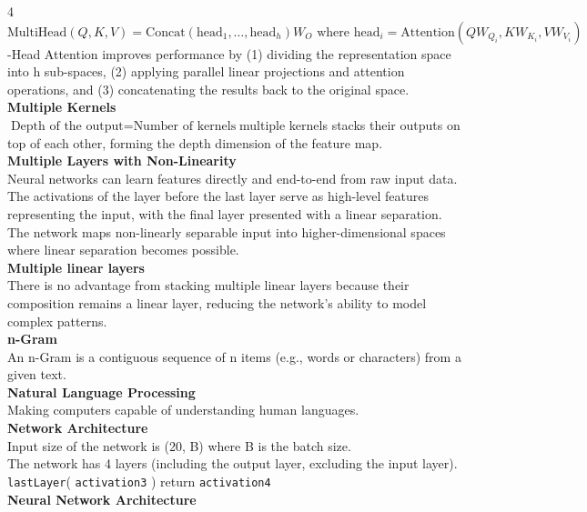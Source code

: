 \documentclass[8pt]{extarticle}
\begin{document}
\begin{multicols}{4}
$ \text{MultiHead}(Q, K, V) = \text{Concat}(\text{head}_1, \dots, \text{head}_h) W_O \text{ where } \text{head}_i = \text{Attention}(Q W_{Q_i}, K W_{K_i}, V W_{V_i})$\Multi-Head Attention improves performance by (1) dividing the representation space into h sub-spaces, (2) applying parallel linear projections and attention operations, and (3) concatenating the results back to the original space.\\
\vspace{2pt}\textbf{Multiple Kernels}\\
$ \text{Depth of the output} = \text{Number of kernels}$\Applying multiple kernels stacks their outputs on top of each other, forming the depth dimension of the feature map.\\
\vspace{2pt}\textbf{Multiple Layers with Non-Linearity}\\
Neural networks can learn features directly and end-to-end from raw input data. The activations of the layer before the last layer serve as high-level features representing the input, with the final layer presented with a linear separation. The network maps non-linearly separable input into higher-dimensional spaces where linear separation becomes possible.\\
\vspace{2pt}\textbf{Multiple linear layers}\\
There is no advantage from stacking multiple linear layers because their composition remains a linear layer, reducing the network's ability to model complex patterns.\\
\vspace{2pt}\textbf{n-Gram}\\
An n-Gram is a contiguous sequence of n items (e.g., words or characters) from a given text.\\
\vspace{2pt}\textbf{Natural Language Processing}\\
Making computers capable of understanding human languages.\\
\vspace{2pt}\textbf{Network Architecture}\\
Input size of the network is (20, B) where B is the batch size.\\
The network has 4 layers (including the output layer, excluding the input layer).\\
\texttt{lastLayer}( \texttt{activation3} ) return \texttt{activation4}\\
\vspace{2pt}\textbf{Neural Network Architecture}\\

\end{multicols}
\end{document}
